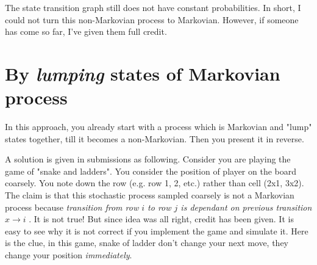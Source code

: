\documentclass[a4paper,10pt]{article}
\begin{document}

The state transition graph still does not have constant probabilities. In
short, I could not turn this non-Markovian process to Markovian. However, if
someone has come so far, I've given them full credit.

\section{By \emph{lumping} states of Markovian process}

In this approach, you already start with a process which is Markovian and "lump"
states together, till it becomes a non-Markovian. Then you present it in
reverse. 

A solution is given in submissions as following. Consider you are playing the
game of "snake and ladders".  You consider the position of player on the board
coarsely. You note down the row (e.g. row 1, 2, etc.) rather than cell (2x1,
3x2). The claim is that this stochastic process sampled coarsely is not a
Markovian process because \emph{transition from row $i$ to row $j$ is dependant
on previous transition $x \rightarrow i$ }. It is not true! But since idea was
all right, credit has been given. It is easy to see why it is not correct if you
implement the game and simulate it. Here is the clue, in this game, snake of
ladder don't change your next move, they change your position
\emph{immediately}. 
\end{document}
